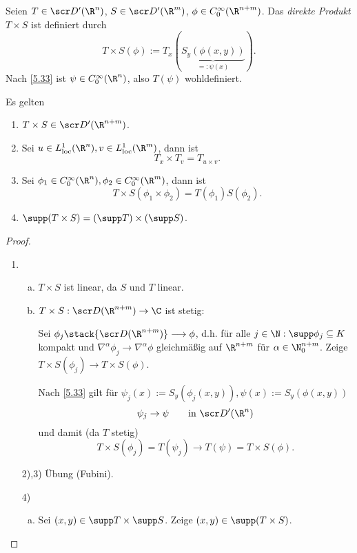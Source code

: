 
\begin{st} \label{5.34}
	Seien $T \in \scr D'(\R^n)$, $S \in \scr D'(\R^m)$, $\phi \in C_0^\infty(\R^{n+m})$.
	Das \emph{direkte Produkt} $T \times S$ ist definiert durch
	\[
		T \times S (\phi)
		:= T_x (\underbrace{S_y (\phi(x,y))}_{=: \psi(x)}).
	\]
	Nach \ref{5.33} ist $\psi \in C_0^\infty(\R^n)$, also $T(\psi)$ wohldefiniert.

	Es gelten
	\begin{enumerate}[1)]
		\item
			$T \times S \in \scr D'(\R^{n+m})$.
		\item
			Sei $u \in L^1_{\text{loc}}(\R^n), v \in L^1_{\text{loc}}(\R^m)$, dann ist
			\[
				T_x \times T_v = T_{u\times v}.
			\]
		\item
			Sei $\phi_1 \in C_0^\infty(\R^n), \phi_2 \in C_0^\infty(\R^m)$, dann ist
			\[
				T \times S (\phi_1 \times \phi_2) = T(\phi_1) S(\phi_2).
			\]
		\item
			$\supp(T \times S) = (\supp T) \times (\supp S)$.
	\end{enumerate}
	\begin{proof}
		\begin{enumerate}[1)]
			\item
				\begin{enumerate}[a)]
					\item
						$T\times S$ ist linear, da $S$ und $T$ linear.
					\item
						$T \times S : \scr D(\R^{n+m}) \to \C$ ist stetig:

						Sei $\phi_j \stack{\scr D(\R^{n+m})}\longrightarrow \phi$, d.h. für alle $j\in \N: \supp \phi_j \subset K$ kompakt und $\nabla^\alpha \phi_j \to \nabla^\alpha \phi$ gleichmäßig auf $\R^{n+m}$ für $\alpha \in \N_0^{n+m}$.
						Zeige $T \times S(\phi_j) \to T\times S(\phi)$.

						Nach \ref{5.33} gilt für $\psi_j(x) := S_y(\phi_j(x,y)), \psi(x) := S_y(\phi(x,y))$
						\[
							\psi_j \to \psi
							\qquad \text{in $\scr D'(\R^n)$}
						\]
						und damit (da $T$ stetig)
						\[
							T \times S (\phi_j)
							= T(\psi_j)
							\to  T(\psi)
							= T \times S (\phi).
						\]
				\end{enumerate}
			\item[2),3)]
				Übung (Fubini).
			\item[4)]
				\begin{enumerate}[a)]
					\item
						Sei $(x,y) \in \supp T \times \supp S$.
						Zeige $(x,y) \in \supp (T \times S)$.


\end{enumerate}
\end{enumerate}
\end{proof}
\end{st}

